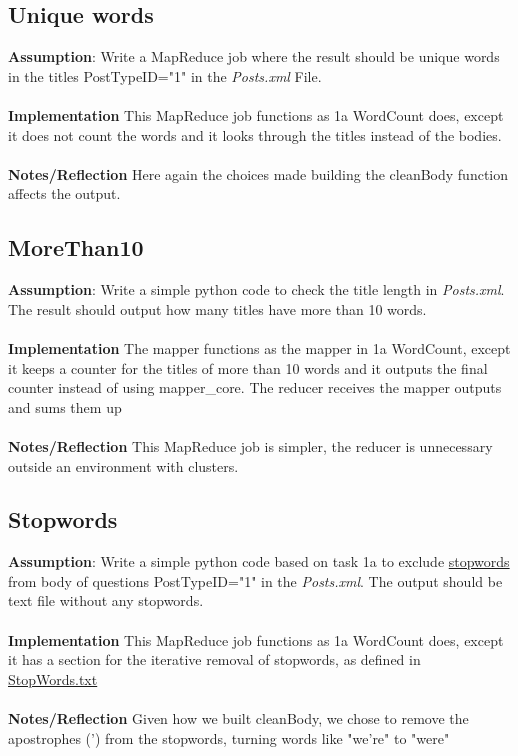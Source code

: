 \documentclass[fleqn,10pt]{wlscirep}
\begin{document}


\subsection{Unique words}
\textbf{Assumption}: Write a MapReduce job where the result should be unique words in the titles PostTypeID="1" in the \textit{Posts.xml} File. \\ \\
\textbf{Implementation} This MapReduce job functions as 1a WordCount does, except it does not count the words and it looks through the titles instead of the bodies. \\ \\
\textbf{Notes/Reflection} Here again the choices made building the cleanBody function affects the output.


\subsection{MoreThan10}
\textbf{Assumption}: Write a simple python code to check the title length in \textit{Posts.xml}. The result should output how many titles have more than 10 words.  \\ \\
\textbf{Implementation} The mapper functions as the mapper in 1a WordCount, except it keeps a counter for the titles of more than 10 words and it outputs the final counter instead of using mapper\_core.
The reducer receives the mapper outputs and sums them up \\ \\
\textbf{Notes/Reflection} This MapReduce job is simpler, the reducer is unnecessary outside an environment with clusters.


\subsection{Stopwords}
\textbf{Assumption}: Write a simple python code based on task 1a to exclude \href{https://raw.githubusercontent.com/naimdjon/stopwords/master/stopwords.txt}{stopwords} from body of questions PostTypeID="1" in the \textit{Posts.xml}. The output should be text file without any stopwords. \\ \\
\textbf{Implementation} This MapReduce job functions as 1a WordCount does, except it has a section for the iterative removal of stopwords, as defined in \href{https://raw.githubusercontent.com/naimdjon/stopwords/master/stopwords.txt}{StopWords.txt} \\ \\
\textbf{Notes/Reflection} Given how we built cleanBody, we chose to remove the apostrophes (') from the stopwords, turning words like "we're" to "were"

\end{document}
